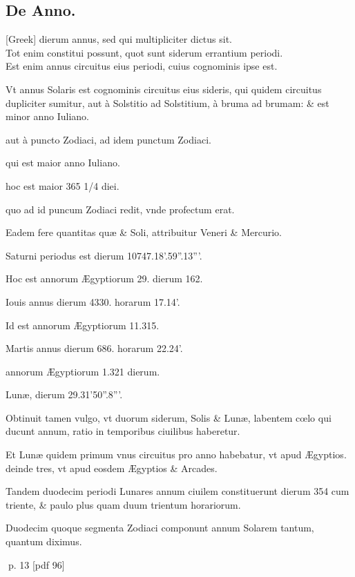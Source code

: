 \subsection{De Anno.}
\setcounter{parcount}{0}
\begin{parnumbers}

 \textgreek{[Greek]} dierum annus, sed qui multipliciter dictus sit. \\ \p
Tot enim constitui possunt, quot sunt siderum errantium periodi.\\ \p
Est enim annus circuitus eius periodi, cuius cognominis ipse est.

Vt annus Solaris est cognominis circuitus eius  sideris, qui quidem circuitus dupliciter sumitur, aut à Solstitio ad Solstitium, à bruma ad brumam: \& est minor anno Iuliano.

aut à puncto Zodiaci, ad idem punctum Zodiaci.

qui est maior anno Iuliano.

hoc est maior 365 1/4 diei.

quo ad id puncum Zodiaci redit, vnde profectum erat.

Eadem fere quantitas quæ \& Soli, attribuitur Veneri \& Mercurio.

Saturni periodus est dierum 10747.18'.59''.13'''.

Hoc est annorum Ægyptiorum 29. dierum 162.

Iouis annus dierum 4330. horarum 17.14'.

Id est annorum Ægyptiorum 11.315.

Martis annus dierum 686. horarum 22.24'.

annorum Ægyptiorum 1.321 dierum.

Lunæ, dierum 29.31'50''.8'''.

Obtinuit tamen vulgo, vt duorum siderum, Solis \& Lunæ, labentem cœlo qui ducunt annum, ratio in  temporibus ciuilibus haberetur.

Et Lunæ quidem primum vnus circuitus pro anno habebatur, vt apud Ægyptios. deinde tres, vt apud eosdem Ægyptios \& Arcades.

Tandem duodecim periodi Lunares annum ciuilem constituerunt dierum 354 cum triente, \& paulo plus quam duum trientum horariorum.

Duodecim quoque segmenta Zodiaci componunt annum Solarem tantum, quantum diximus.

\end{parnumbers}
\clearpage
p. 13 [pdf 96]

